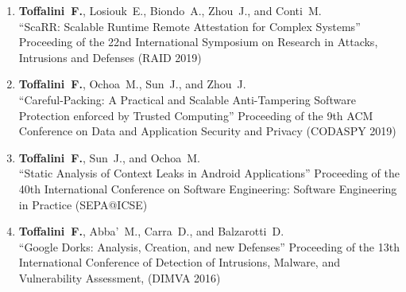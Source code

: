 \begin{enumerate}[leftmargin=5mm]
\item[C4] \textbf{Toffalini~F.}, Losiouk~E., Biondo~A., Zhou~J., and Conti~M.\\``ScaRR: Scalable Runtime Remote Attestation for Complex Systems'' Proceeding of the 22nd International Symposium on Research in Attacks, Intrusions and Defenses (RAID 2019) 
\item[C3] \textbf{Toffalini~F.}, Ochoa~M., Sun~J., and Zhou~J.\\``Careful-Packing: A Practical and Scalable Anti-Tampering Software Protection enforced by Trusted Computing'' Proceeding of the 9th ACM Conference on Data and Application Security and Privacy (CODASPY 2019) 
\item[C2] \textbf{Toffalini~F.}, Sun~J., and Ochoa~M.\\``Static Analysis of Context Leaks in Android Applications'' Proceeding of the 40th International Conference on Software Engineering: Software Engineering in Practice (SEPA@ICSE) 
\item[C1] \textbf{Toffalini~F.}, Abba'~M., Carra~D., and Balzarotti~D.\\``Google Dorks: Analysis, Creation, and new Defenses'' Proceeding of the 13th International Conference of Detection of Intrusions, Malware, and Vulnerability Assessment, (DIMVA 2016) 
\end{enumerate}
